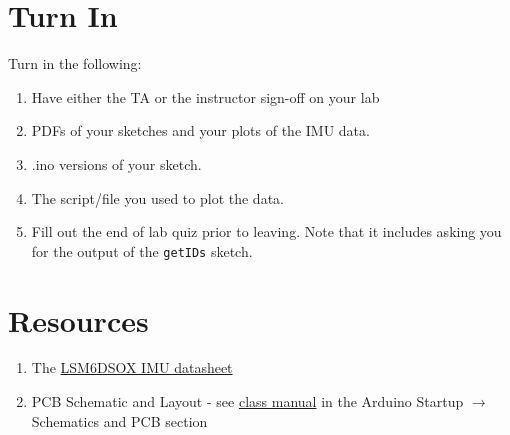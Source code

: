 \section{Turn In}
Turn in the following:
\begin{enumerate}
    \item Have either the TA or the instructor sign-off on your lab
    \item PDFs of your sketches and your plots of the IMU data.
    \item .ino versions of your sketch.
    \item The script/file you used to plot the data.
    \item Fill out the end of lab quiz prior to leaving. Note that it includes asking you 
            for the output of the \lstinline$getIDs$ sketch. 
\end{enumerate}

\section{Resources}\label{sec:imuresources}
\begin{enumerate}
    \item The \href{https://www.st.com/resource/en/datasheet/lsm6dsox.pdf}{LSM6DSOX IMU datasheet}
    \item PCB Schematic and Layout - see 
            \href{https://github.com/semcneil/Fundamentals-of-Microcontrollers-Manual}{class manual} 
            in the Arduino Startup $\rightarrow$ Schematics and PCB section
\end{enumerate}

